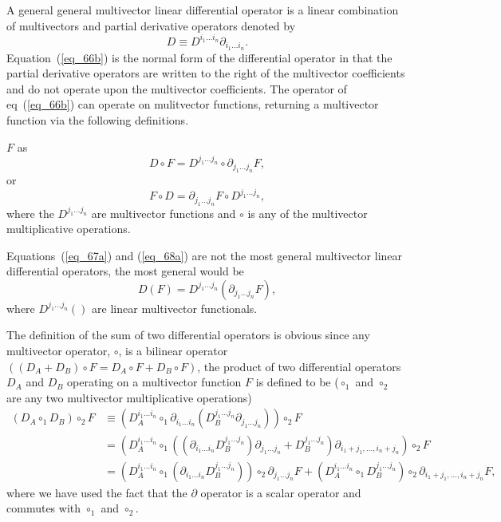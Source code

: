 \documentclass[12pt]{report}
\newcommand{\lp}{\left (}
\newcommand{\rp}{\right )}
\newcommand{\f}[2]{{#1}\lp {#2} \rp}
\newcommand{\paren}[1]{\lp {#1} \rp}
\newcommand{\be}{\begin{equation}}
\newcommand{\ee}{\end{equation}}
\begin{document}
A general general multivector linear differential operator is a linear combination of multivectors and partial derivative operators
denoted by
\be\label{eq_66b}
    D \equiv D^{i_{1}\dots i_{n}}\partial_{i_{1}\dots i_{n}}.
\ee
Equation~(\ref{eq_66b}) is the normal form of the differential operator in that the partial derivative operators are written to the right
of the multivector coefficients and do not operate upon the multivector coefficients.
The operator of eq~(\ref{eq_66b}) can operate on mulitvector functions, returning a multivector function via the following definitions.


$F$ as
\be\label{eq_67a}
    D\circ F = D^{j_{1}\dots j_{n}}\circ\partial_{j_{1}\dots j_{n}}F,
\ee
or
\be\label{eq_68a}
    F\circ D = \partial_{j_{1}\dots j_{n}}F\circ D^{j_{1}\dots j_{n}},
\ee
where the $D^{j_{1}\dots j_{n}}$ are multivector functions and $\circ$ is any of the multivector multiplicative operations.

Equations~(\ref{eq_67a}) and (\ref{eq_68a}) are not the most general multivector linear differential operators, the most general would be
\be
    \f{D}{F} = \f{D^{j_{1}\dots j_{n}}}{\partial_{j_{1}\dots j_{n}}F},
\ee
where $\f{D^{j_{1}\dots j_{n}}}{}$ are linear multivector functionals.

The definition of the sum of two differential operators is obvious since any multivector operator, $\circ$, is a bilinear operator
$\paren{\paren{D_{A}+D_{B}}\circ F = D_{A}\circ F+D_{B}\circ F}$, the product of two differential operators $D_{A}$ and $D_{B}$ operating on a multivector function $F$ is defined to be ($\circ_{1}$ and $\circ_{2}$ are any two multivector multiplicative operations)
\begin{align*}
    \paren{D_{A}\circ_{1}D_{B}}\circ_{2}F &\equiv \paren{D_{A}^{i_{1}\dots i_{n}}\circ_{1}
                                                  \partial_{i_{1}\dots i_{n}}\paren{D_{B}^{j_{1}\dots j_{n}}
                                                  \partial_{j_{1}\dots j_{n}}}}\circ_{2}F \nonumber \\
                                          &= \paren{D_{A}^{i_{1}\dots i_{n}}\circ_{1}
                                             \paren{\paren{\partial_{i_{1}\dots i_{n}}D_{B}^{j_{1}\dots j_{n}}}
                                             \partial_{j_{1}\dots j_{n}}+
                                             D_{B}^{j_{1}\dots j_{n}}}
                                             \partial_{i_{1}+j_{1},\dots, i_{n}+j_{n}}}\circ_{2}F \nonumber \\
                                          &= \paren{D_{A}^{i_{1}\dots i_{n}}\circ_{1}\paren{\partial_{i_{1}\dots i_{n}}D_{B}^{j_{1}\dots j_{n}}}}
                                             \circ_{2}\partial_{j_{1}\dots j_{n}}F+
                                             \paren{D_{A}^{i_{1}\dots i_{n}}\circ_{1}D_{B}^{j_{1}\dots j_{n}}}
                                             \circ_{2}\partial_{i_{1}+j_{1},\dots, i_{n}+j_{n}}F,
\end{align*}
where we have used the fact that the $\partial$ operator is a scalar operator and commutes with $\circ_{1}$ and $\circ_{2}$.
\end{document}
